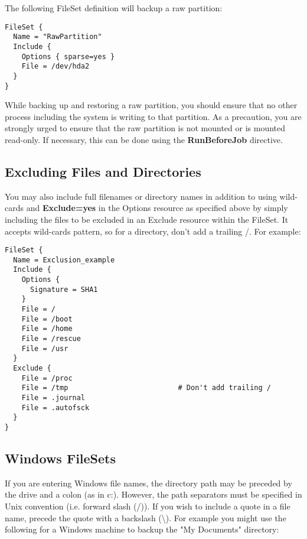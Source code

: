 The following FileSet definition will backup a raw partition:

\footnotesize
\begin{verbatim}
FileSet {
  Name = "RawPartition"
  Include {
    Options { sparse=yes }
    File = /dev/hda2
  }
}
\end{verbatim}
\normalsize

While backing up and restoring a raw partition, you should ensure that no
other process including the system is writing to that partition. As a
precaution, you are strongly urged to ensure that the raw partition is not
mounted or is mounted read-only. If necessary, this can be done using the {\bf
RunBeforeJob} directive.


\subsection{Excluding Files and Directories}

You may also include full filenames or directory names in addition to using
wild-cards and {\bf Exclude=yes} in the Options resource as specified above by
simply including the files to be excluded in an Exclude resource within the
FileSet. It accepts wild-cards pattern, so for a directory, don't add a trailing
/. For example:

\footnotesize
\begin{verbatim}
FileSet {
  Name = Exclusion_example
  Include {
    Options {
      Signature = SHA1
    }
    File = /
    File = /boot
    File = /home
    File = /rescue
    File = /usr
  }
  Exclude {
    File = /proc
    File = /tmp                          # Don't add trailing /
    File = .journal
    File = .autofsck
  }
}
\end{verbatim}
\normalsize

\label{win32}
\subsection{Windows FileSets}
If you are entering Windows file names, the directory path may be preceded by
the drive and a colon (as in c:). However, the path separators must be
specified in Unix convention (i.e. forward slash (/)). If you wish to include
a quote in a file name, precede the quote with a backslash
(\textbackslash{}). For example you might use the following
for a Windows machine to backup the "My Documents" directory:

